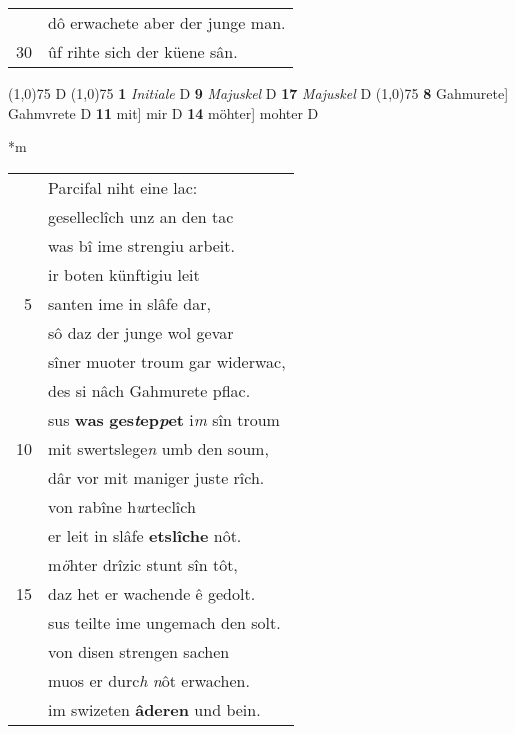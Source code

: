 \documentclass[8pt,a4paper,notitlepage]{article}
\begin{document}
\begin{table}[ht]
\begin{minipage}[t]{0.5\linewidth}
\begin{tabular}{rl}
 & dô erwachete aber der junge man.\\ 
30 & ûf rihte sich der küene sân.\\ 
\end{tabular}
\scriptsize
\line(1,0){75} \newline
D \newline
\line(1,0){75} \newline
\textbf{1} \textit{Initiale} D  \textbf{9} \textit{Majuskel} D  \textbf{17} \textit{Majuskel} D  \newline
\line(1,0){75} \newline
\textbf{8} Gahmurete] Gahmvrete D \textbf{11} mit] mir D \textbf{14} möhter] mohter D \newline
\end{minipage}
\hspace{0.5cm}
\begin{minipage}[t]{0.5\linewidth}
\small
\begin{center}*m
\end{center}
\begin{tabular}{rl}
 & Parcifal niht eine lac:\\ 
 & geselleclîch unz an den tac\\ 
 & was bî ime strengiu arbeit.\\ 
 & ir boten künftigiu leit\\ 
5 & santen ime in slâfe dar,\\ 
 & sô daz der junge wol gevar\\ 
 & sîner muoter troum gar widerwac,\\ 
 & des si nâch Gahmurete pflac.\\ 
 & sus \textbf{was} \textbf{ges\textit{t}ep\textit{p}et} i\textit{m} sîn troum\\ 
10 & mit swertslege\textit{n} umb den soum,\\ 
 & dâr vor mit maniger juste rîch.\\ 
 & von rabîne h\textit{u}rteclîch\\ 
 & er leit in slâfe \textbf{etslîche} nôt.\\ 
 & m\textit{ö}hter drîzic stunt sîn tôt,\\ 
15 & daz het er wachende ê gedolt.\\ 
 & sus teilte ime ungemach den solt.\\ 
 & von disen strengen sachen\\ 
 & muos er durc\textit{h} \textit{n}ôt erwachen.\\ 
 & im swizeten \textbf{âderen} und bein.\\ 

\end{tabular}
\end{minipage}
\end{table}
\end{document}
